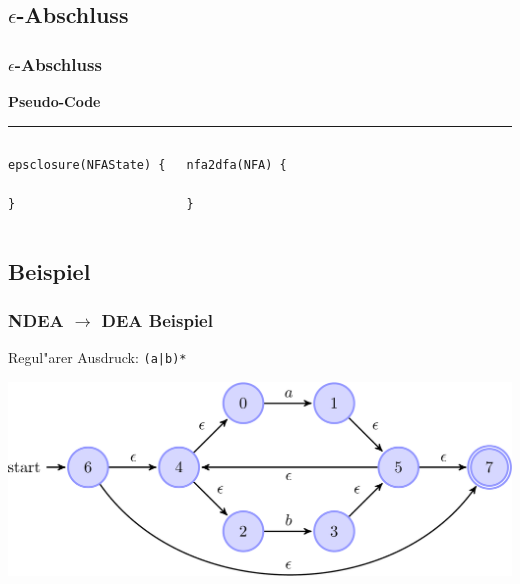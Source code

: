 \documentclass[ignorenonframetext]{beamer}
\begin{document}
\subsection{$\epsilon$-Abschluss}
\begin{frame}[fragile]
    \frametitle{$\epsilon$-Abschluss}
    
        \textbf{Pseudo-Code} 
        \hrule
        \begin{columns}
        \column{5cm}
\begin{lstlisting}
epsclosure(NFAState) {

}
\end{lstlisting}

        \column{5cm}
\begin{lstlisting}
nfa2dfa(NFA) {

}
\end{lstlisting}

        \end{columns}
\end{frame}


\subsection{Beispiel}
\begin{frame}[plain]
    \frametitle{NDEA $\rightarrow$ DEA Beispiel}
    
    Regul"arer Ausdruck: \texttt{(a|b)*}

    \begin{center}
        \includegraphics[scale=0.27]{aorbstar0.pdf}
    \end{center}
\end{frame}
\end{document}
